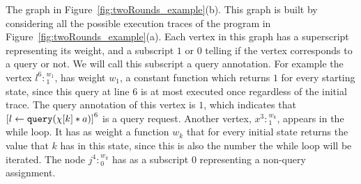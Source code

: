 \begin{example}[twoRounds]
      The graph in Figure~\ref{fig:twoRounds_example}(b). This graph is built by considering all the possible execution traces of the program in   Figure~\ref{fig:twoRounds_example}(a).
      Each vertex in this graph has a superscript representing its weight, and a subscript $1$ or $0$ telling if the vertex corresponds to a query or not. We will call this subscript a query annotation. 
      For example the vertex $l^{6}:{}^{w_1}_1$, 
      has weight $w_1$, a constant function which returns $1$ for every starting state, since 
      this query at line $6$ is at most executed once regardless of the initial trace.
      The query annotation of this vertex is $1$, which  indicates that 
      $\clabel{\assign{l}{\query(\chi[k] * a)}}^6$ is a query request.
      Another vertex, $x^{3}:{}^{w_k}_1$, appears in the while loop. 
      It has as weight a function $w_k$ that for every initial state returns the value that $k$ has in this state, since this is also the number the while loop will be iterated. 
      The node $j^{4}:{}^{w_k}_0$ has as a subscript $0$ representing a non-query assignment.
      

\end{example}
